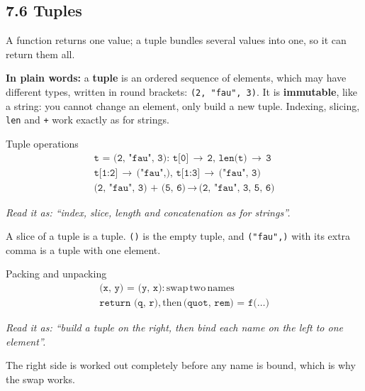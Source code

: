 \documentclass[11pt]{article}
\begin{document}
\begin{keepsection}
\section{7.6 Tuples}

A function returns one value; a tuple bundles several values into one, so it can return them all.

\begin{plainbox}\textbf{In plain words:} a \textbf{tuple} is an ordered sequence of elements, which may have different types, written in round brackets: \texttt{(2, "fau", 3)}. It is \textbf{immutable}, like a string: you cannot change an element, only build a new tuple. Indexing, slicing, \texttt{len} and \texttt{+} work exactly as for strings.\end{plainbox}

\begin{equationcard}{Tuple operations}
\[ \begin{gathered} \texttt{t = (2, "fau", 3)}:\, \texttt{t[0]}\, \to \, \texttt{2},\, \texttt{len(t)}\, \to \, \texttt{3} \\ \texttt{t[1:2]}\, \to \, \texttt{("fau",)},\, \texttt{t[1:3]}\, \to \, \texttt{("fau", 3)} \\ \texttt{(2, "fau", 3) + (5, 6)}\, \to \, \texttt{(2, "fau", 3, 5, 6)} \end{gathered} \]
{\small \emph{Read it as: “index, slice, length and concatenation as for strings”.}\par  A slice of a tuple is a tuple. \texttt{()} is the empty tuple, and \texttt{("fau",)} with its extra comma is a tuple with one element.}
\end{equationcard}

\begin{equationcard}{Packing and unpacking}
\[ \begin{gathered} \texttt{(x, y) = (y, x)}:\, \text{swap}\, \text{two}\, \text{names} \\ \texttt{return (q, r)},\, \text{then}\, \texttt{(quot, rem) = f(…)} \end{gathered} \]
{\small \emph{Read it as: “build a tuple on the right, then bind each name on the left to one element”.}\par  The right side is worked out completely before any name is bound, which is why the swap works.}
\end{equationcard}


\end{keepsection}
\end{document}
